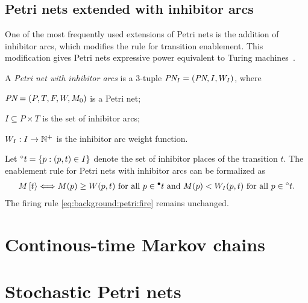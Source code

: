 \subsection{Petri nets extended with inhibitor arcs}

One of the most frequently used extensions of Petri nets is the
addition of inhibitor arcs, which modifies the rule for transition
enablement. This modification gives Petri nets expressive power
equivalent to Turing
machines~\citep{DBLP:conf/apn/Chrzastowski-Wachtel99}.

\begin{dfn}
  A \emph{Petri net with inhibitor arcs} is a 3-tuple $\textit{PN}_I = (\textit{PN},
  I, W_I)$, where
  \begin{asparaitem}
  \item $\textit{PN} = (P, T, F, W, M_0)$ is a Petri net;
  \item $I \subseteq P \times T$ is the set of inhibitor arcs;
  \item $W_I: I \to \mathbb{N}^{+}$ is the inhibitor arc weight function.
  \end{asparaitem}
\end{dfn}

Let $\prescript{\circ}{}{t} = \{ p : (p, t) \in I\}$ denote the set of inhibitor
places of the transition $t$. The enablement rule for Petri nets with
inhibitor arcs can be formalized as
\begin{equation}
  \label{eq:background:petri:inh-fire}
  M\,\mathbin{[t\rangle} \Longleftrightarrow \text{\strut$M(p) \ge W(p, t)$ for all
    $p \in \prescript{\bullet}{}{t}$ and $M(p) < W_I(p, t)$ for all $p \in
    \prescript{\circ}{}{t}$.}
\end{equation}
The firing rule \eqref{eq:background:petri:fire} remains unchanged.

\section{Continous-time Markov chains}



\section{Stochastic Petri nets}
